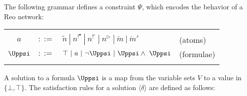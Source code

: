 The following grammar defines a constraint $\Psi$, which encodes the behavior of a Reo network:

\begin{tabular}{c c l l}
\centering
  & \\
  $a $&$::=$&$ \tilde{n}\ |\ n^{!^\bullet}\ |\ n^{!^\circ}\ | \ n^\triangleright\ |\ \mathring{m}\ |\ \mathring{m}'$& (atoms)\\
  $\Uppsi $&$::=$&$ \top \ | \ a\ |\ \neg \Uppsi \ | \ \Uppsi \wedge \ \Uppsi $ & (formulae)\\
  &
\end{tabular}

%
A solution to a formula $\Uppsi$ is a map from the variable sets $V$ to  a value in $\{\bot, \top\}$. The satisfaction rules for a solution $\langle \delta \rangle$ are defined as follows:

